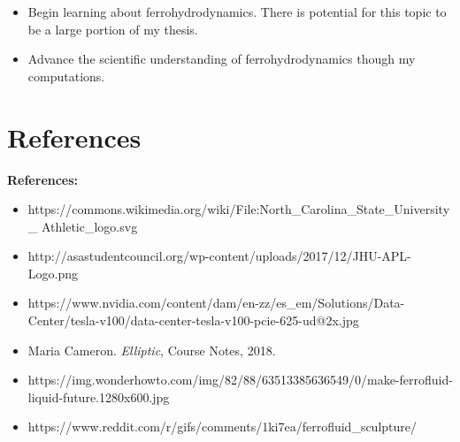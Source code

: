 \documentclass[9pt]{beamer}
\begin{document}
\begin{frame}
\begin{itemize}
		\item Begin learning about ferrohydrodynamics. There is potential for this topic to be a large portion of my thesis.
		
		\item Advance the scientific understanding of ferrohydrodynamics though my computations.
	\end{itemize}

\end{frame}

\section{References}
\begin{frame}
	\textbf{References:}
	\begin{itemize}
		\item https://commons.wikimedia.org/wiki/File:North\_Carolina\_State\_University\_
		Athletic\_logo.svg
		
		\item http://asastudentcouncil.org/wp-content/uploads/2017/12/JHU-APL-Logo.png
		
		\item https://www.nvidia.com/content/dam/en-zz/es\_em/Solutions/Data-Center/tesla-v100/data-center-tesla-v100-pcie-625-ud@2x.jpg
		
		\item Maria Cameron. \textit{Elliptic}, Course Notes, 2018.
		
		\item https://img.wonderhowto.com/img/82/88/63513385636549/0/make-ferrofluid-liquid-future.1280x600.jpg
		
		\item https://www.reddit.com/r/gifs/comments/1ki7ea/ferrofluid\_sculpture/
	\end{itemize}
\end{frame}
\end{document}
